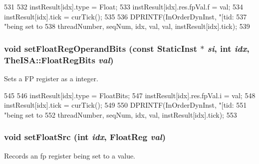 \begin{DoxyCode}
531 {
532     instResult[idx].type = Float;
533     instResult[idx].res.fpVal.f = val;
534     instResult[idx].tick = curTick();
535 
536     DPRINTF(InOrderDynInst, "[tid:%
537             "being set to %
538             threadNumber, seqNum, idx, val, val, instResult[idx].tick);
539 }
\end{DoxyCode}
\hypertarget{classInOrderDynInst_a724fbca03bfcb160789e0458751994d5}{
\subsubsection[{setFloatRegOperandBits}]{\setlength{\rightskip}{0pt plus 5cm}void setFloatRegOperandBits (const {\bf StaticInst} $\ast$ {\em si}, \/  int {\em idx}, \/  TheISA::FloatRegBits {\em val})}}
\label{classInOrderDynInst_a724fbca03bfcb160789e0458751994d5}
Sets a FP register as a integer. 


\begin{DoxyCode}
545 {
546     instResult[idx].type = FloatBits;
547     instResult[idx].res.fpVal.i = val;
548     instResult[idx].tick = curTick();
549 
550     DPRINTF(InOrderDynInst, "[tid:%
551             "being set to %
552             threadNumber, seqNum, idx, val, instResult[idx].tick);
553 }
\end{DoxyCode}
\hypertarget{classInOrderDynInst_a13221677b93471d0bdeaa974555be906}{
\subsubsection[{setFloatSrc}]{\setlength{\rightskip}{0pt plus 5cm}void setFloatSrc (int {\em idx}, \/  {\bf FloatReg} {\em val})}}
\label{classInOrderDynInst_a13221677b93471d0bdeaa974555be906}
Records an fp register being set to a value. 


